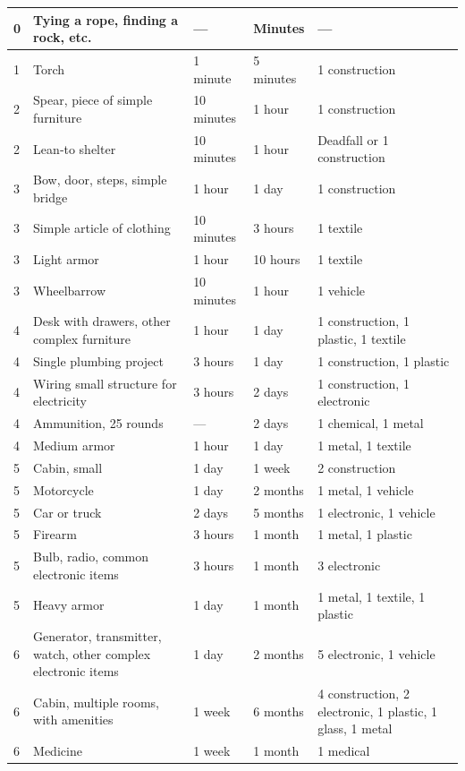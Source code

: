 \begin{longtable}{| p{3cm} | p{3cm} | p{3cm} | p{3cm} | p{3cm} |}
0 & Tying a rope, finding a rock, etc. & —  & Minutes & — \\ \hline 
1 & Torch & 1 minute & 5 minutes & 1 construction  \\ \hline
2 & Spear, piece of simple furniture & 10 minutes  & 1 hour & 1 construction  \\ \hline
2 & Lean‑to shelter  & 10 minutes & 1 hour & Deadfall or 1 construction  \\ \hline
3 & Bow, door, steps, simple bridge & 1 hour  & 1 day & 1 construction  \\ \hline
3 & Simple article of clothing & 10 minutes  & 3 hours  & 1 textile  \\ \hline
3 & Light armor & 1 hour & 10 hours & 1 textile  \\ \hline
3 & Wheelbarrow & 10 minutes & 1 hour & 1 vehicle  \\ \hline
4 & Desk with drawers, other complex furniture & 1 hour & 1 day  & 1 construction, 1 plastic, 1 textile  \\ \hline
4 & Single plumbing project & 3 hours  & 1 day & 1 construction, 1 plastic  \\ \hline
4 & Wiring small structure for electricity & 3 hours & 2 days  & 1 construction, 1 electronic  \\ \hline
4 & Ammunition, 25 rounds  & —  & 2 days  & 1 chemical, 1 metal  \\ \hline
4 & Medium armor & 1 hour & 1 day & 1 metal, 1 textile  \\ \hline
5 & Cabin, small & 1 day & 1 week  & 2 construction  \\ \hline
5 & Motorcycle  & 1 day  & 2 months  & 1 metal, 1 vehicle  \\ \hline
5 & Car or truck  & 2 days  & 5 months  & 1 electronic, 1 vehicle  \\ \hline
5 & Firearm & 3 hours  & 1 month  & 1 metal, 1 plastic  \\ \hline
5 & Bulb, radio, common electronic items  & 3 hours  & 1 month  & 3 electronic  \\ \hline
5 & Heavy armor & 1 day  & 1 month & 1 metal, 1 textile, 1 plastic  \\ \hline
6 & Generator, transmitter, watch, other complex electronic items & 1 day  & 2 months  & 5 electronic, 1 vehicle  \\ \hline
6 & Cabin, multiple rooms, with amenities  & 1 week  & 6 months  & 4 construction, 2 electronic, 1 plastic, 1 glass, 1 metal \\ \hline
6 & Medicine & 1 week  & 1 month  & 1 medical  \\ \hline

\end{longtable}

